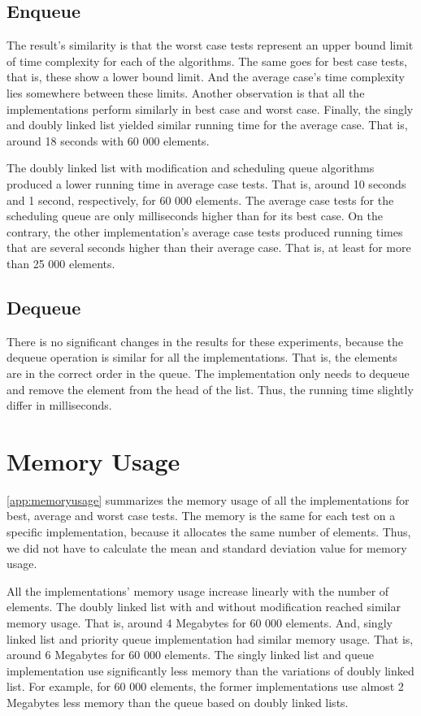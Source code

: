 \documentclass[a4paper,11pt]{kth-mag}
\newcommand*{\skippara}{\par\vspace{\baselineskip} \noindent}
\begin{document}
\subsection{Enqueue}
The result's similarity is that the worst case tests represent an upper bound limit of time complexity for each of the algorithms.
The same goes for best case tests, that is, these show a lower bound limit.
And the average case's time complexity lies somewhere between these limits.
Another observation is that all the implementations perform similarly in best case and worst case.
Finally, the singly and doubly linked list yielded similar running time for the average case.
That is, around 18 seconds with 60 000 elements.

\skippara The doubly linked list with modification and scheduling queue algorithms produced a lower running time in average case tests.
That is, around 10 seconds and 1 second, respectively, for 60 000 elements.
The average case tests for the scheduling queue are only milliseconds higher than for its best case.
On the contrary, the other implementation's average case tests produced running times that are several seconds higher than their average case.
That is, at least for more than 25 000 elements.



\subsection{Dequeue}

There is no significant changes in the results for these experiments, because the dequeue operation is similar for all the implementations.
That is, the elements are in the correct order in the queue.
The implementation only needs to dequeue and remove the element from the head of the list.
Thus, the running time slightly differ in milliseconds.

\section{Memory Usage}

\cref{app:memoryusage} summarizes the memory usage of all the implementations for best, average and worst case tests.
The memory is the same for each test on a specific implementation, because it allocates the same number of elements.
Thus, we did not have to calculate the mean and standard deviation value for memory usage.

\skippara All the implementations' memory usage increase linearly with the number of elements.
The doubly linked list with and without modification reached similar memory usage.
That is, around 4 Megabytes for 60 000 elements.
And, singly linked list and priority queue implementation had similar memory usage.
That is, around 6 Megabytes for 60 000 elements.
The singly linked list and queue implementation use significantly less memory than the variations of doubly linked list.
For example, for 60 000 elements, the former implementations use almost 2 Megabytes less memory than the queue based on doubly linked lists.
\end{document}
